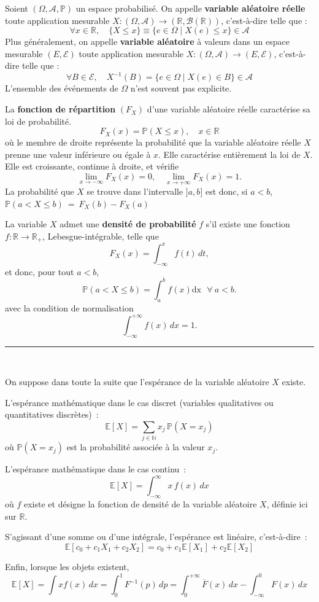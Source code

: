\begin{f}
	
	Soient \( (\Omega, \mathcal{A}, \mathbb{P})\) un espace probabilisé. 
On appelle \textbf{variable aléatoire réelle} toute application mesurable 
\(X : (\Omega, \mathcal{A}) \to (\mathbb{R}, \mathcal{B}(\mathbb{R}))\), 
c'est-à-dire telle que :
\[
\forall x \in \mathbb{R}, \quad \lbrace X\leq x \rbrace \equiv 
\lbrace e\in \Omega \mid X(e)\leq x \rbrace \in \mathcal{A}
\]
Plus généralement, on appelle \textbf{variable aléatoire} à valeurs dans 
un espace mesurable \((E, \mathcal{E})\) toute application mesurable 
\(X : (\Omega, \mathcal{A}) \to (E, \mathcal{E})\), c'est-à-dire telle que :
\[
\forall B \in \mathcal{E}, \quad X^{-1}(B) = 
\lbrace e \in \Omega \mid X(e) \in B \rbrace \in \mathcal{A}
\]
	L'ensemble des événements de \(\Omega\) n'est souvent pas explicite.
	
	La \textbf{fonction de répartition} \((F_X)\) d'une variable aléatoire réelle caractérise sa loi de probabilité. 
	\[
	F_X(x)=\mathbb {P}(X\leq x),\quad  x\in \mathbb{R}
	\]
	où le membre de droite représente la probabilité que la variable aléatoire réelle \(X\) prenne une valeur inférieure ou égale à \(x\).
	Elle caractérise entièrement la loi de \(X\). Elle est croissante, continue à droite, et vérifie
	\[
	\lim_{x\to -\infty} F_X(x)=0, \quad \lim_{x\to +\infty} F_X(x)=1.
	\]
	La probabilité que \(X\) se trouve dans l'intervalle \(]a, b]\) est donc, si \(a< b\),
	\(
	\mathbb{P}(a< X\leq b)\ =\ F_X(b)-F_X(a)
	\)
	
La variable \(X\) admet une  \textbf{densité de probabilité} \(f\) s’il existe une fonction \(f : \mathbb{R} \to \mathbb{R}_+\), Lebesgue-intégrable, telle que
\[
F_X(x)=\int_{-\infty}^x f(t)\,dt,
\]
et donc, pour tout \(a<b\),	
	\[
	\mathbb{P}(a< X\leq b)=\int_a^b f(x) \mathrm{dx} \mbox{ \  }\forall\ a<b.
	\]
	avec la condition de normalisation
	\[
	\int_{-\infty}^{+\infty} f(x)\,dx = 1.
	\]
\end{f}
\hrule
\begin{f}[Espérance]{\ }
	
On suppose dans toute la suite que l'espérance de la variable aléatoire \(X\) existe.

L'espérance mathématique dans le cas discret (variables qualitatives ou quantitatives discrètes)~:
\[
\mathbb{E}[X]=\sum_{j\in \mathbb{N}} x_j\,\mathbb{P}(X=x_j)
\]
où \(\mathbb{P}(X=x_j)\) est la probabilité associée à la valeur \(x_j\).

L'espérance mathématique dans le cas continu~:
\[
\mathbb{E}[X]=\int_{-\infty}^{\infty} x\, f(x)\,dx
\]
où \(f\) existe et désigne la fonction de densité de la variable aléatoire \(X\), définie ici sur \(\mathbb{R}\).

S'agissant d'une somme ou d'une intégrale, l'espérance est linéaire, c'est-à-dire~:
\[
\mathbb{E}\left[c_0+c_1X_1+c_2X_2\right]=c_0+c_1\mathbb{E}[X_1]+c_2\mathbb{E}[X_2]
\]

Enfin, lorsque les objets existent,
\[
\mathbb{E}[X]=\int x f(x)\,dx
= \int_0^1 F^{-1}(p)\,dp
= \int_{0}^{+\infty} \overline{F}(x)\,dx -\int_{-\infty}^{0}  F(x)\,dx
\]
\end{f}
